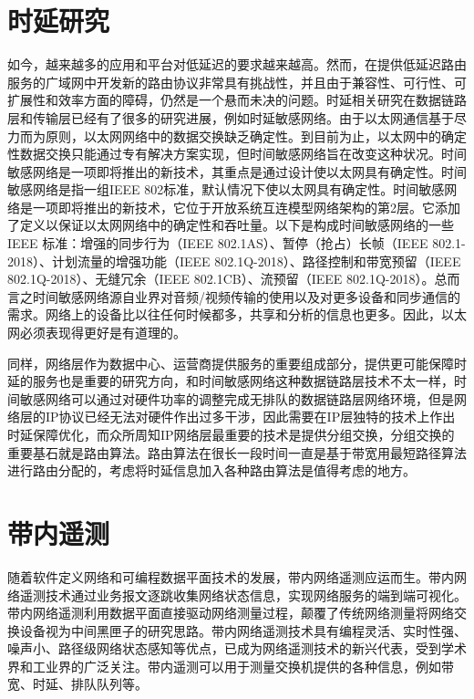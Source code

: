 \section{时延研究}

如今，越来越多的应用和平台对低延迟的要求越来越高。然而，在提供低延迟路由服务的广域网中开发新的路由协议非常具有挑战性，并且由于兼容性、可行性、可扩展性和效率方面的障碍，仍然是一个悬而未决的问题。时延相关研究在数据链路层和传输层已经有了很多的研究进展，例如时延敏感网络。由于以太网通信基于尽力而为原则，以太网网络中的数据交换缺乏确定性。到目前为止，以太网中的确定性数据交换只能通过专有解决方案实现，但时间敏感网络旨在改变这种状况。时间敏感网络是一项即将推出的新技术，其重点是通过设计使以太网具有确定性。时间敏感网络是指一组IEEE 802标准，默认情况下使以太网具有确定性。时间敏感网络是一项即将推出的新技术，它位于开放系统互连模型网络架构的第2层。它添加了定义以保证以太网网络中的确定性和吞吐量。以下是构成时间敏感网络的一些 IEEE 标准：增强的同步行为（IEEE 802.1AS）、暂停（抢占）长帧（IEEE 802.1-2018）、计划流量的增强功能（IEEE 802.1Q-2018）、路径控制和带宽预留（IEEE 802.1Q-2018）、无缝冗余（IEEE 802.1CB）、流预留（IEEE 802.1Q-2018）。总而言之时间敏感网络源自业界对音频/视频传输的使用以及对更多设备和同步通信的需求。网络上的设备比以往任何时候都多，共享和分析的信息也更多。因此，以太网必须表现得更好是有道理的。

同样，网络层作为数据中心、运营商提供服务的重要组成部分，提供更可能保障时延的服务也是重要的研究方向，和时间敏感网络这种数据链路层技术不太一样，时间敏感网络可以通过对硬件功率的调整完成无排队的数据链路层网络环境，但是网络层的IP协议已经无法对硬件作出过多干涉，因此需要在IP层独特的技术上作出时延保障优化，而众所周知IP网络层最重要的技术是提供分组交换，分组交换的重要基石就是路由算法。路由算法在很长一段时间一直是基于带宽用最短路径算法进行路由分配的，考虑将时延信息加入各种路由算法是值得考虑的地方。

\section{带内遥测}

随着软件定义网络和可编程数据平面技术的发展，带内网络遥测应运而生。带内网络遥测技术通过业务报文逐跳收集网络状态信息，实现网络服务的端到端可视化。带内网络遥测利用数据平面直接驱动网络测量过程，颠覆了传统网络测量将网络交换设备视为中间黑匣子的研究思路。带内网络遥测技术具有编程灵活、实时性强、噪声小、路径级网络状态感知等优点，已成为网络遥测技术的新兴代表，受到学术界和工业界的广泛关注。带内遥测可以用于测量交换机提供的各种信息，例如带宽、时延、排队队列等。

